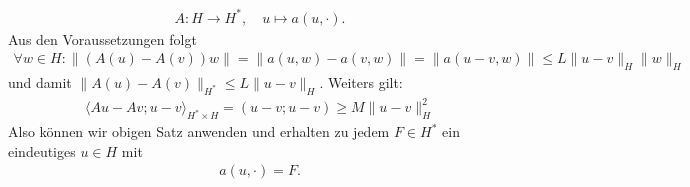 \begin{solution}
\begin{itemize}
\begin{align*}
    A: H \to H^*, \quad u \mapsto a(u,\cdot).
  \end{align*}
  Aus den Voraussetzungen folgt
  \begin{align*}
    \forall w \in H: \|(A(u)- A(v))w\| = \|a(u,w) - a(v,w)\| = \|a(u - v,w)\| \leq L\|u-v\|_H\|w\|_H
  \end{align*}
  und damit $\|A(u) - A(v)\|_{H^*} \leq L\|u-v\|_H$.
  Weiters gilt:
  \begin{align*}
    \langle Au - Av; u - v \rangle_{H^*\times H} = (u - v; u - v) \geq M\|u-v\|_H^2
  \end{align*}
  Also können wir obigen Satz anwenden und erhalten zu jedem $F \in H^*$ ein eindeutiges $u \in H$ mit
  \begin{align*}
    a(u,\cdot) = F.
  \end{align*}

\end{itemize}
\end{solution}

